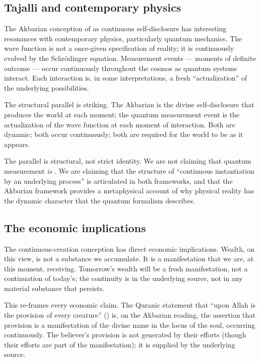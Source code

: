 \subsection{Tajalli and contemporary physics}

The Akbarian conception of  as continuous self-disclosure
has interesting resonances with contemporary physics, particularly
quantum mechanics. The wave function is not a once-given specification
of reality; it is continuously evolved by the Schr\"odinger
equation. Measurement events --- moments of definite outcome ---
occur continuously throughout the cosmos as quantum systems
interact. Each interaction is, in some interpretations, a fresh
``actualization'' of the underlying possibilities.

The structural parallel is striking. The Akbarian  is
the divine self-disclosure that produces the world at each moment;
the quantum measurement event is the actualization of the wave
function at each moment of interaction. Both are dynamic; both
occur continuously; both are required for the world to be as it
appears.

The parallel is structural, not strict identity. We are not claiming
that quantum measurement \emph{is} . We are claiming
that the structure of ``continuous instantiation by an underlying
process'' is articulated in both frameworks, and that the Akbarian
framework provides a metaphysical account of why physical reality
has the dynamic character that the quantum formalism describes.

\subsection{The economic implications}

The continuous-creation conception has direct economic implications.
Wealth, on this view, is not a substance we accumulate. It is a
manifestation that we are, at this moment, receiving. Tomorrow's
wealth will be a fresh manifestation, not a continuation of
today's; the continuity is in the underlying source, not in any
material substance that persists.

This re-frames every economic claim. The Quranic statement that
``upon Allah is the provision of every creature'' ()
is, on the Akbarian reading, the assertion that provision is a
manifestation of the divine name  in the locus of
the soul, occurring continuously. The believer's provision is not
generated by their efforts (though their efforts are part of the
manifestation); it is supplied by the underlying source.

